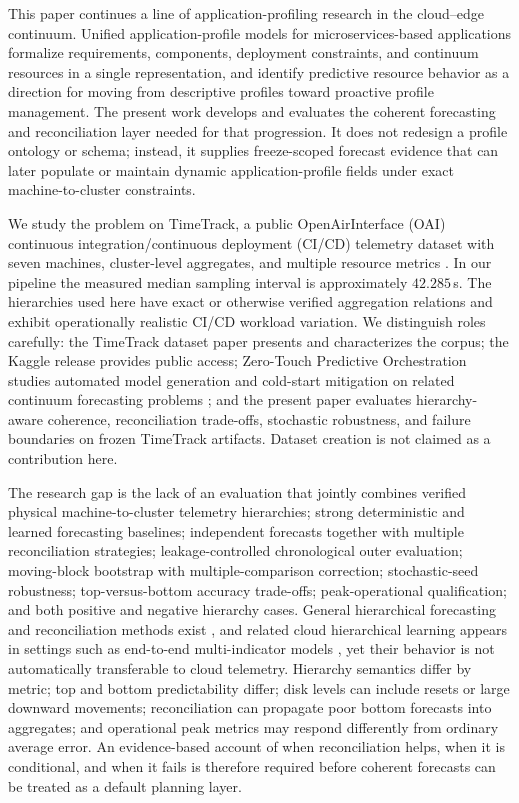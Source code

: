 \documentclass[a4paper,fleqn]{cas-dc}
\begin{document}
This paper continues a line of application-profiling research in the
cloud--edge continuum.
Unified application-profile models for microservices-based applications
formalize requirements, components, deployment constraints, and continuum
resources in a single representation, and identify predictive resource
behavior as a direction for moving from descriptive profiles toward
proactive profile management.
The present work develops and evaluates the coherent forecasting and
reconciliation layer needed for that progression.
It does not redesign a profile ontology or schema; instead, it supplies
freeze-scoped forecast evidence that can later populate or maintain dynamic
application-profile fields under exact machine-to-cluster constraints.

We study the problem on TimeTrack, a public OpenAirInterface ({OAI}) continuous
integration/continuous deployment ({CI}/{CD}) telemetry dataset with seven
machines, cluster-level aggregates, and multiple resource metrics
\cite{meliani2025timetrack,meliani2025timetrackkaggle}.
In our pipeline the measured median sampling interval is approximately
$42.285$\,s.
The hierarchies used here have exact or otherwise verified aggregation
relations and exhibit operationally realistic {CI}/{CD} workload variation.
We distinguish roles carefully: the TimeTrack dataset paper presents and
characterizes the corpus; the Kaggle release provides public access; Zero-Touch
Predictive Orchestration studies automated model generation and cold-start
mitigation on related continuum forecasting problems
\cite{meliani2026zerotouch};
and the present paper evaluates hierarchy-aware coherence, reconciliation
trade-offs, stochastic robustness, and failure boundaries on frozen TimeTrack
artifacts.
Dataset creation is not claimed as a contribution here.

The research gap is the lack of an evaluation that jointly combines verified
physical machine-to-cluster telemetry hierarchies; strong deterministic and
learned forecasting baselines; independent forecasts together with multiple
reconciliation strategies; leakage-controlled chronological outer evaluation;
moving-block bootstrap with multiple-comparison correction; stochastic-seed
robustness; top-versus-bottom accuracy trade-offs; peak-operational
qualification; and both positive and negative hierarchy cases.
General hierarchical forecasting and reconciliation methods exist
\cite{wickramasuriya2019mint,athanasopoulos2024hierarchical},
and related cloud hierarchical learning appears in settings such as
end-to-end multi-indicator models
\cite{harmony2024},
yet their behavior is not automatically transferable to cloud telemetry.
Hierarchy semantics differ by metric; top and bottom predictability differ;
disk levels can include resets or large downward movements; reconciliation can
propagate poor bottom forecasts into aggregates; and operational peak metrics
may respond differently from ordinary average error.
An evidence-based account of when reconciliation helps, when it is conditional,
and when it fails is therefore required before coherent forecasts can be treated
as a default planning layer.
\end{document}
